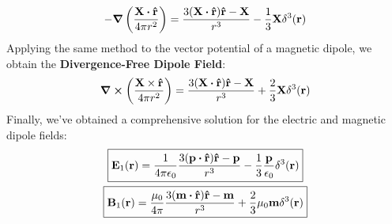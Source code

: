 \documentclass{article}
\numberwithin{equation}{section}
\begin{document}
\begin{equation}
-\grad\left(\frac{\vb{X}\vdot\vu{r}}{4\pi r^2}\right)=\frac{3(\vb{X}\vdot\vu{r})\vu{r}-\vb{X}}{r^3}-\frac{1}{3}\vb{X}\delta^3(\vb{r})\label{eqn:eq50}
\end{equation}
Applying the same method to the vector potential of a magnetic dipole, we obtain the \textbf{Divergence-Free Dipole Field}:
\begin{equation}
\curl\left(\frac{\vb{X}\times\vu{r}}{4\pi r^2}\right)=\frac{3(\vb{X}\vdot\vu{r})\vu{r}-\vb{X}}{r^3}+\frac{2}{3}\vb{X}\delta^3(\vb{r})\label{eqn:eq51}
\end{equation}
Finally, we've obtained a comprehensive solution for the electric and magnetic dipole fields:
\begin{gather}
\boxed{\vb{E}_1(\vb{r})=\frac{1}{4\pi\epsilon_0}\frac{3(\vb{p}\vdot\vu{r})\vu{r}-\vb{p}}{r^3}-\frac{1}{3}\frac{\vb{p}}{\epsilon_0} \delta^3(\vb{r})}\label{eqn:eq52}\\\boxed{\vb{B}_1(\vb{r})=\frac{\mu_0}{4\pi}\frac{3(\vb{m}\vdot\vu{r})\vu{r}-\vb{m}}{r^3}+\frac{2}{3}\mu_0 \vb{m} \delta^3(\vb{r})}\label{eqn:eq53}
\end{gather}
\end{document}
